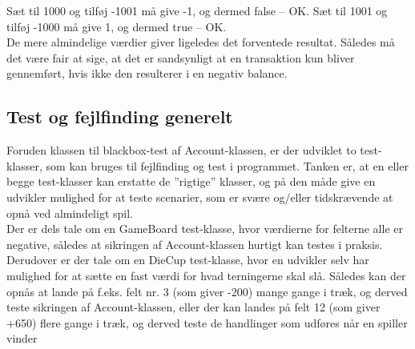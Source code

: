 Sæt til 1000 og tilføj -1001 må give -1, og dermed false – OK.
Sæt til 1001 og tilføj -1000 må give 1, og dermed true – OK.
\\

De mere almindelige værdier giver ligeledes det forventede resultat. Således må det være fair at sige, at det er sandsynligt at en transaktion kun bliver gennemført, hvis ikke den resulterer i en negativ balance.
\\

\subsection{Test og fejlfinding generelt}
Foruden klassen til blackbox-test af Account-klassen, er der udviklet to test-klasser, som kan bruges til fejlfinding og test i programmet. Tanken er, at en eller begge test-klasser kan erstatte de ”rigtige” klasser, og på den måde give en udvikler mulighed for at teste scenarier, som er svære og/eller tidskrævende at opnå ved almindeligt spil.
\\

Der er dels tale om en GameBoard test-klasse, hvor værdierne for felterne alle er negative, således at sikringen af Account-klassen hurtigt kan testes i praksis. Derudover er der tale om en DieCup test-klasse, hvor en udvikler selv har mulighed for at sætte en fast værdi for hvad terningerne skal slå. Således kan der opnås at lande på f.eks. felt nr. 3 (som giver -200) mange gange i træk, og derved teste sikringen af Account-klassen, eller der kan landes på felt 12 (som giver +650) flere gange i træk, og derved teste de handlinger som udføres når en spiller vinder